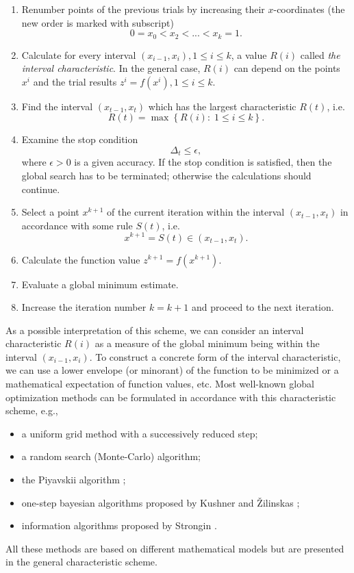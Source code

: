 \documentclass{svproc}
\begin{document}
\begin{enumerate}
	\item 
Renumber points of the previous trials by increasing their $x$-coordinates (the new order is marked with subscript)
\[
0=x_0<x_2<...<x_{k}=1.
\]

	\item 
Calculate for every interval $(x_{i-1},x_i), 1\leq i\leq k$, a value $R(i)$ called \textit{the interval characteristic}. In the general case, $R(i)$ can depend on the points $x^i$ and the trial results $z^i=f(x^i), 1 \leq i \leq k$.

	\item 
Find the interval $(x_{t-1},x_t)$ which has the largest characteristic $R(t)$, i.e.
\[
R(t) = \max \left\{ R(i): \; 1\leq i\leq k \right\}.
\]

	\item 
Examine the stop condition
\[
\Delta_t \leq \epsilon ,
\]
where $\epsilon>0$ is a given accuracy. If the stop condition is satisfied, then the global search has to be terminated; otherwise the calculations should continue.

	\item 
Select a point $x^{k+1}$ of the current iteration within the interval $(x_{t-1},x_t)$ in accordance with some rule $S(t)$, i.e.
\[
x^{k+1} = S(t)\in(x_{t-1},x_t).
\]
	
	\item 
Calculate the function value $z^{k+1} = f(x^{k+1})$.

	\item 
Evaluate a global minimum estimate. 

	\item 
Increase the iteration number $k=k+1$ and proceed to the next iteration.
\end{enumerate}


As a possible interpretation of this scheme, we can consider an interval characteristic $R(i)$ as a measure of the global minimum being within the interval
$(x_{i-1},x_i)$.
To construct a concrete form of the interval characteristic, we can use a lower envelope (or minorant) of the function to be minimized or a mathematical expectation of function values, etc. 
Most well-known global optimization methods can be formulated in accordance with this characteristic scheme, e.g.,
\begin{itemize}
\item a uniform grid method with a successively reduced step;
\item a random search (Monte-Carlo) algorithm;
\item the Piyavskii algorithm \cite{Piyavskii1972};
\item one-step bayesian algorithms proposed by Kushner and {\v Z}ilinskas \cite{Zilinskas1989};
\item information algorithms proposed by Strongin \cite{Strongin2000}.
\end{itemize}
All these methods are based on different mathematical models but are presented in the general characteristic scheme.
\end{document}
